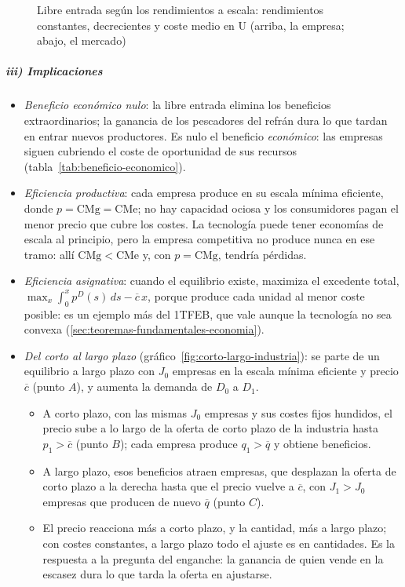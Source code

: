 \documentclass[11pt]{article}
\begin{document}
\begin{figure}[H]
\centering
\caption{Libre entrada según los rendimientos a escala: rendimientos constantes, decrecientes y coste medio en U (arriba, la empresa; abajo, el mercado)}\label{fig:libre-entrada}
\end{figure}

\subparagraph{iii) Implicaciones}

\begin{itemize}
\item \emph{Beneficio económico nulo}: la libre entrada elimina los beneficios extraordinarios; la ganancia de los pescadores del refrán dura lo que tardan en entrar nuevos productores. Es nulo el beneficio \emph{económico}: las empresas siguen cubriendo el coste de oportunidad de sus recursos (tabla~\ref{tab:beneficio-economico}).
\item \emph{Eficiencia productiva}: cada empresa produce en su escala mínima eficiente, donde $p=\mathrm{CMg}=\mathrm{CMe}$; no hay capacidad ociosa y los consumidores pagan el menor precio que cubre los costes. La tecnología puede tener economías de escala al principio, pero la empresa competitiva no produce nunca en ese tramo: allí $\mathrm{CMg}<\mathrm{CMe}$ y, con $p=\mathrm{CMg}$, tendría pérdidas.
\item \emph{Eficiencia asignativa}: cuando el equilibrio existe, maximiza el excedente total, $\max_x\int_0^xp^D(s)\,ds-\overline{c}\,x$, porque produce cada unidad al menor coste posible: es un ejemplo más del 1TFEB, que vale aunque la tecnología no sea convexa (\ref{sec:teoremas-fundamentales-economia}).
\item \emph{Del corto al largo plazo} (gráfico~\ref{fig:corto-largo-industria}): se parte de un equilibrio a largo plazo con $J_0$ empresas en la escala mínima eficiente y precio $\overline{c}$ (punto $A$), y aumenta la demanda de $D_0$ a $D_1$.
  \begin{itemize}
  \item A corto plazo, con las mismas $J_0$ empresas y sus costes fijos hundidos, el precio sube a lo largo de la oferta de corto plazo de la industria hasta $p_1>\overline{c}$ (punto $B$); cada empresa produce $q_1>\overline{q}$ y obtiene beneficios.
  \item A largo plazo, esos beneficios atraen empresas, que desplazan la oferta de corto plazo a la derecha hasta que el precio vuelve a $\overline{c}$, con $J_1>J_0$ empresas que producen de nuevo $\overline{q}$ (punto $C$)\nocite{MasColellWhinstonGreen1995}.
  \item El precio reacciona más a corto plazo, y la cantidad, más a largo plazo; con costes constantes, a largo plazo todo el ajuste es en cantidades. Es la respuesta a la pregunta del enganche: la ganancia de quien vende en la escasez dura lo que tarda la oferta en ajustarse.
  \end{itemize}
\end{itemize}
\end{document}
